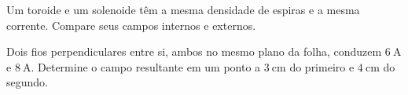\begin{questao}[2]{}

Um toroide e um solenoide têm a mesma densidade de espiras e a mesma corrente.
Compare seus campos internos e externos.


\end{questao}
\begin{questao}[2]{}

Dois fios perpendiculares entre si, ambos no mesmo plano da folha, conduzem
$\SI{6}{\ampere}$ e $\SI{8}{\ampere}$. Determine o campo resultante em um
ponto a $\SI{3}{\centi\meter}$ do primeiro e $\SI{4}{\centi\meter}$ do
segundo.


\end{questao}

